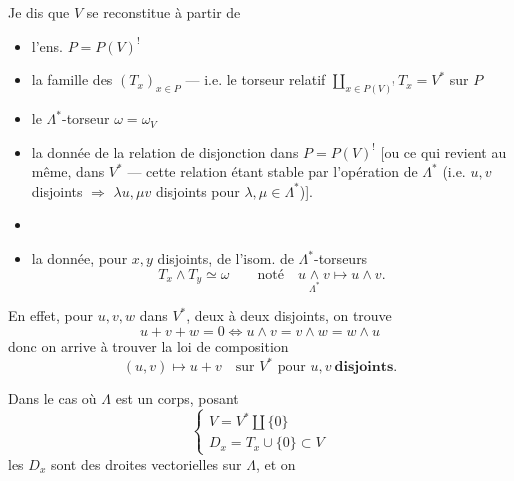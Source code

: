 \documentclass[11pt,a4paper]{article}
\begin{document}
Je dis que  $V$ se reconstitue  à partir de
\begin{itemize}
  \item[a)] l'ens. $P = P(V)^!$
  \item[b)] la famille des  $(T_x)_{x \in P}$ ---
    i.e. le torseur relatif
    $\coprod_{x \in P(V)^!} T_x = V^{*}$ sur $P$
  \item[c)] le $\Lambda^{*}$-torseur $\omega = \omega_V$
  \item[d)] la donnée de la relation de disjonction dans $P = P(V)^!$
    [ou ce qui revient au même, dans $V^{*}$ --- cette relation étant
    stable par l'opération de $\Lambda^{*}$ (i.e. $u, v$ disjoints
    $\Rightarrow$ $\lambda u, \mu v$ disjoints pour $\lambda, \mu \in
    \Lambda^{*}$)].
  \item[\struck{e)}] 
  \item[e)] la donnée, pour $x, y$ disjoints, de l'isom. de
    $\Lambda^{*}$-torseurs
    \[
      T_x \wedge T_y \simeq \omega \qquad \text{noté}\quad
      u \mathbin{\underset{\Lambda^{*}}{\wedge}} v \longmapsto u \wedge v .
    \]
\end{itemize}

En effet, pour \struck{\ill{}} $u, v, w$ dans $V^{*}$, deux à deux disjoints,
on trouve
\[
  u + v + w = 0 \iff u \wedge v = v \wedge w = w \wedge u
\]
donc on arrive à trouver la loi de composition 
\[
  (u, v) \longmapsto u + v \quad \text{sur } V^{*} \text{ pour } u, v
  \ \textbf{disjoints}.
\]

 Dans le cas où $\Lambda$ est un corps, posant
\[
  \begin{cases}
    V = V^{*} \amalg \{0\} \\
    D_x = T_x \cup \{0\} \subset V
  \end{cases}
\]
les $D_x$ sont des droites vectorielles sur $\Lambda$, et on

\end{document}
